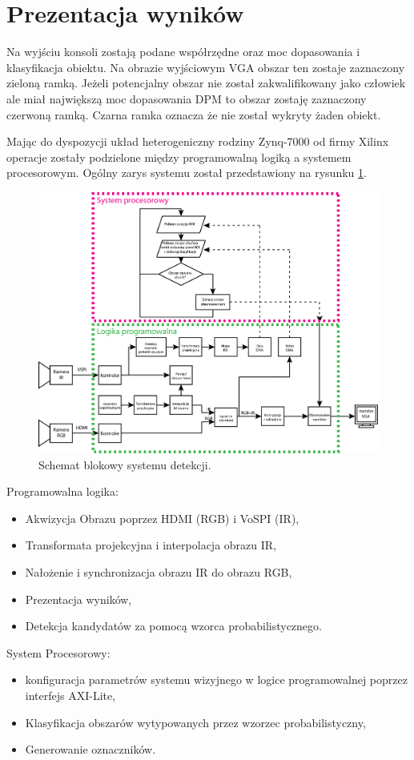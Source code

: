 \section{Prezentacja wyników}
Na wyjściu konsoli zostają podane współrzędne oraz moc dopasowania i klasyfikacja obiektu. Na obrazie wyjściowym VGA obszar ten zostaje zaznaczony zieloną ramką. Jeżeli potencjalny obszar nie został zakwalifikowany jako człowiek ale miał największą moc dopasowania DPM to obszar zostaję zaznaczony czerwoną ramką. Czarna ramka oznacza że nie został wykryty żaden obiekt. 

Mając do dyspozycji układ heterogeniczny rodziny Zynq-7000 od firmy Xilinx operacje zostały podzielone między programowalną logiką a systemem procesorowym. Ogólny zarys systemu został przedstawiony na rysunku \ref{fig:systemwizyjny}.

\begin{figure}[h]
    \centering
    \includegraphics[width=1\textwidth]{images/system}
    \caption{Schemat blokowy systemu detekcji.}
    \label{fig:systemwizyjny}
\end{figure}

Programowalna logika:
\begin{itemize}
\item Akwizycja Obrazu poprzez HDMI (RGB) i VoSPI (IR),
\item Transformata projekcyjna i interpolacja obrazu IR,
\item Nałożenie i synchronizacja obrazu IR do obrazu RGB,
\item Prezentacja wyników,
\item Detekcja kandydatów za pomocą wzorca probabilistycznego.
\end{itemize}
System Procesorowy:
\begin{itemize}
\item konfiguracja parametrów systemu wizyjnego w logice programowalnej poprzez interfejs AXI-Lite,
\item Klasyfikacja obszarów wytypowanych przez wzorzec probabilistyczny,
\item Generowanie oznaczników.
\end{itemize}

